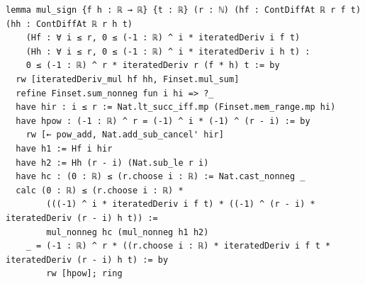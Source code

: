 \begin{Verbatim}[fontsize=\scriptsize,frame=single,framesep=1.5mm]
lemma mul_sign {f h : ℝ → ℝ} {t : ℝ} (r : ℕ) (hf : ContDiffAt ℝ r f t) (hh : ContDiffAt ℝ r h t)
    (Hf : ∀ i ≤ r, 0 ≤ (-1 : ℝ) ^ i * iteratedDeriv i f t)
    (Hh : ∀ i ≤ r, 0 ≤ (-1 : ℝ) ^ i * iteratedDeriv i h t) :
    0 ≤ (-1 : ℝ) ^ r * iteratedDeriv r (f * h) t := by
  rw [iteratedDeriv_mul hf hh, Finset.mul_sum]
  refine Finset.sum_nonneg fun i hi => ?_
  have hir : i ≤ r := Nat.lt_succ_iff.mp (Finset.mem_range.mp hi)
  have hpow : (-1 : ℝ) ^ r = (-1) ^ i * (-1) ^ (r - i) := by
    rw [← pow_add, Nat.add_sub_cancel' hir]
  have h1 := Hf i hir
  have h2 := Hh (r - i) (Nat.sub_le r i)
  have hc : (0 : ℝ) ≤ (r.choose i : ℝ) := Nat.cast_nonneg _
  calc (0 : ℝ) ≤ (r.choose i : ℝ) *
        (((-1) ^ i * iteratedDeriv i f t) * ((-1) ^ (r - i) * iteratedDeriv (r - i) h t)) :=
        mul_nonneg hc (mul_nonneg h1 h2)
    _ = (-1 : ℝ) ^ r * ((r.choose i : ℝ) * iteratedDeriv i f t * iteratedDeriv (r - i) h t) := by
        rw [hpow]; ring
\end{Verbatim}
